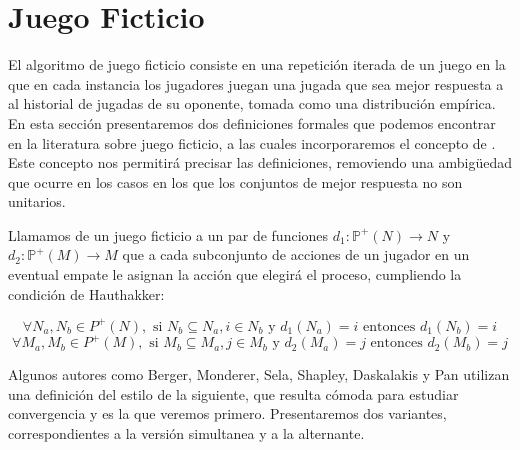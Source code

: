 
\section{Juego Ficticio} \label{sec:def:fp}

El algoritmo de juego ficticio consiste en una repetición iterada de un juego en la que en cada instancia los jugadores juegan una jugada que sea mejor respuesta a al historial de jugadas de su oponente, tomada como una distribución empírica. En esta sección presentaremos dos definiciones formales que podemos encontrar en la literatura sobre juego ficticio, a las cuales incorporaremos el concepto de . Este concepto nos permitirá precisar las definiciones, removiendo una ambigüedad que ocurre en los casos en los que los conjuntos de mejor respuesta no son unitarios.

\begin{definition}
    Llamamos  de un juego ficticio a un par de funciones $d_1: \mathbb{P}^+(N) \rightarrow N$ y $d_2: \mathbb{P}^+(M) \rightarrow M$ que a cada subconjunto de acciones de un jugador en un eventual empate le asignan la acción que elegirá el proceso, cumpliendo la condición de Hauthakker:

    \[
        \forall N_a, N_b \in {P}^+(N), \text{ si } N_b \subseteq N_a, i \in N_b \text{ y } d_1(N_a) = i  \text{ entonces } d_1(N_b) = i
    \]
    \[
        \forall M_a, M_b \in {P}^+(M), \text{ si } M_b \subseteq M_a, j \in M_b \text{ y } d_2(M_a) = j  \text{ entonces } d_2(M_b) = j
    \]
\end{definition}

Algunos autores como Berger, Monderer, Sela, Shapley, Daskalakis y Pan \cite{browns:original} \cite{no:cycling} \cite{2x2:without} \cite{identical:interests} \cite{counter:karlin:strong} utilizan una definición del estilo de la siguiente, que resulta cómoda para estudiar convergencia y es la que veremos primero. Presentaremos dos variantes, correspondientes a la versión simultanea y a la alternante.

